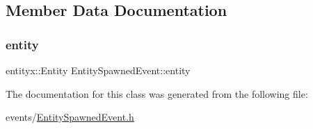 \subsection{Member Data Documentation}
\mbox{\label{classEntitySpawnedEvent_a5c5e65c69bfd2783367202115bcced3c}} 
\subsubsection{\texorpdfstring{entity}{entity}}
{\footnotesize\ttfamily entityx\+::\+Entity Entity\+Spawned\+Event\+::entity}



The documentation for this class was generated from the following file\+:\begin{DoxyCompactItemize}
\item 
events/\hyperlink{EntitySpawnedEvent_8h}{Entity\+Spawned\+Event.\+h}\end{DoxyCompactItemize}
